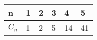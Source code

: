 \begin{center}
    \begin{tabular}{@{}llllll@{}}
        \toprule
        n & 1 & 2 & 3  & 4  & 5  \\ \midrule
        $C_n$ & 1 & 2 & 5 & 14 & 41 \\ 
        \bottomrule
    \end{tabular}\\
\end{center}